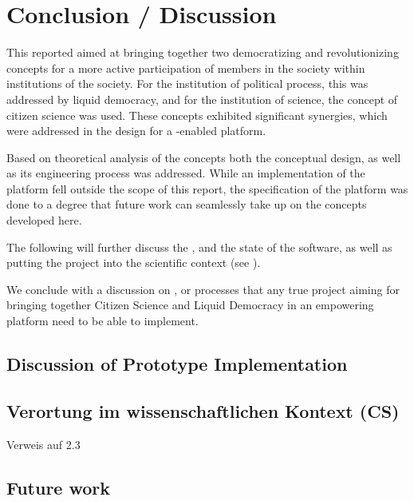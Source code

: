 \chapter{Conclusion / Discussion}
\label{ch:Conclusion}

This reported aimed at bringing together two democratizing and revolutionizing concepts for a more active participation of members in the society within institutions of the society. For the institution of political process, this was addressed by liquid democracy, and for the institution of science, the concept of citizen science was used. These concepts exhibited significant synergies, which were addressed in the design for a -enabled  platform. 

Based on theoretical analysis of the concepts both the conceptual design, as well as its engineering process was addressed. While an implementation of the platform fell outside the scope of this report, the specification of the platform was done to a degree that future work can seamlessly take up on the concepts developed here. 




The following will further discuss the , and the state of the software, as well as putting the project into the scientific context (see ).

We conclude with a discussion on , or processes that any true project aiming for bringing together Citizen Science and Liquid Democracy in an empowering platform need to be able to implement.

\section{Discussion of Prototype Implementation}
\label{sec:DiscussionImplementation}

\section{Verortung im wissenschaftlichen Kontext (CS)}
\label{sec:DiscussionScientificContext}

Verweis auf 2.3

\section{Future work}
\label{sec:FutureWork}


